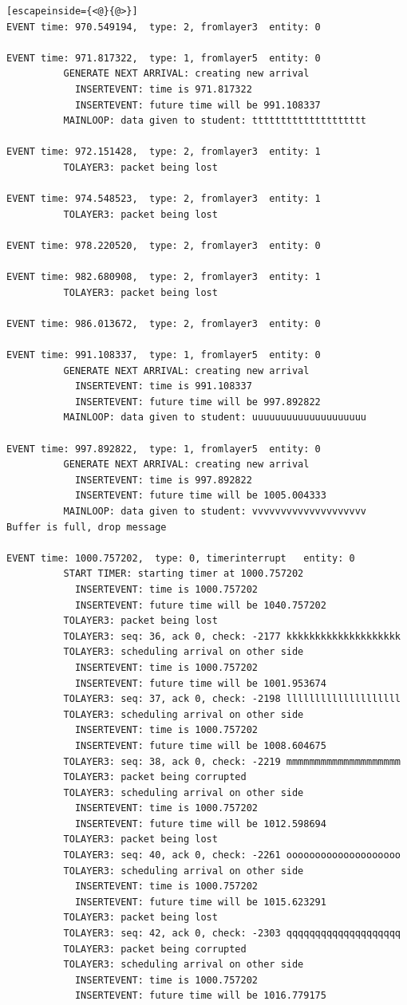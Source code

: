 \documentclass[paper=a4, fontsize=11pt]{scrartcl}
\numberwithin{equation}{section}		%
\numberwithin{figure}{section}			%
\numberwithin{table}{section}				%
\begin{document}
\begin{lstlisting}[escapeinside={<@}{@>}]
EVENT time: 970.549194,  type: 2, fromlayer3  entity: 0

EVENT time: 971.817322,  type: 1, fromlayer5  entity: 0
          GENERATE NEXT ARRIVAL: creating new arrival
            INSERTEVENT: time is 971.817322
            INSERTEVENT: future time will be 991.108337
          MAINLOOP: data given to student: tttttttttttttttttttt

EVENT time: 972.151428,  type: 2, fromlayer3  entity: 1
          TOLAYER3: packet being lost

EVENT time: 974.548523,  type: 2, fromlayer3  entity: 1
          TOLAYER3: packet being lost

EVENT time: 978.220520,  type: 2, fromlayer3  entity: 0

EVENT time: 982.680908,  type: 2, fromlayer3  entity: 1
          TOLAYER3: packet being lost

EVENT time: 986.013672,  type: 2, fromlayer3  entity: 0

EVENT time: 991.108337,  type: 1, fromlayer5  entity: 0
          GENERATE NEXT ARRIVAL: creating new arrival
            INSERTEVENT: time is 991.108337
            INSERTEVENT: future time will be 997.892822
          MAINLOOP: data given to student: uuuuuuuuuuuuuuuuuuuu

EVENT time: 997.892822,  type: 1, fromlayer5  entity: 0
          GENERATE NEXT ARRIVAL: creating new arrival
            INSERTEVENT: time is 997.892822
            INSERTEVENT: future time will be 1005.004333
          MAINLOOP: data given to student: vvvvvvvvvvvvvvvvvvvv
Buffer is full, drop message

EVENT time: 1000.757202,  type: 0, timerinterrupt   entity: 0
          START TIMER: starting timer at 1000.757202
            INSERTEVENT: time is 1000.757202
            INSERTEVENT: future time will be 1040.757202
          TOLAYER3: packet being lost
          TOLAYER3: seq: 36, ack 0, check: -2177 kkkkkkkkkkkkkkkkkkkk
          TOLAYER3: scheduling arrival on other side
            INSERTEVENT: time is 1000.757202
            INSERTEVENT: future time will be 1001.953674
          TOLAYER3: seq: 37, ack 0, check: -2198 llllllllllllllllllll
          TOLAYER3: scheduling arrival on other side
            INSERTEVENT: time is 1000.757202
            INSERTEVENT: future time will be 1008.604675
          TOLAYER3: seq: 38, ack 0, check: -2219 mmmmmmmmmmmmmmmmmmmm
          TOLAYER3: packet being corrupted
          TOLAYER3: scheduling arrival on other side
            INSERTEVENT: time is 1000.757202
            INSERTEVENT: future time will be 1012.598694
          TOLAYER3: packet being lost
          TOLAYER3: seq: 40, ack 0, check: -2261 oooooooooooooooooooo
          TOLAYER3: scheduling arrival on other side
            INSERTEVENT: time is 1000.757202
            INSERTEVENT: future time will be 1015.623291
          TOLAYER3: packet being lost
          TOLAYER3: seq: 42, ack 0, check: -2303 qqqqqqqqqqqqqqqqqqqq
          TOLAYER3: packet being corrupted
          TOLAYER3: scheduling arrival on other side
            INSERTEVENT: time is 1000.757202
            INSERTEVENT: future time will be 1016.779175


\end{lstlisting}
\end{document}
